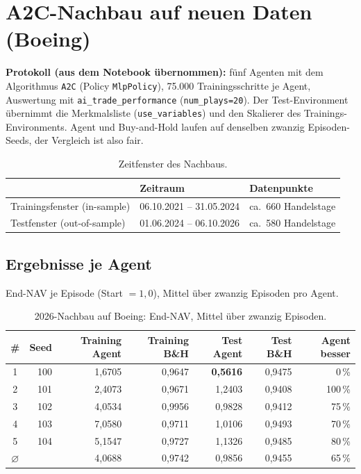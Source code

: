 \section{A2C-Nachbau auf neuen Daten (Boeing)}
\label{sec:a2c}

\textbf{Protokoll (aus dem Notebook übernommen):} fünf Agenten mit dem Algorithmus
\texttt{A2C} (Policy \texttt{MlpPolicy}), 75.000 Trainingsschritte je Agent, Auswertung mit
\texttt{ai\_trade\_performance} (\texttt{num\_plays=20}). Der Test-Environment übernimmt die
Merkmalsliste (\texttt{use\_variables}) und den Skalierer des Trainings-Environments. Agent und
Buy-and-Hold laufen auf denselben zwanzig Episoden-Seeds, der Vergleich ist also fair.

\begin{table}[H]
  \centering
  \caption{Zeitfenster des Nachbaus.}
  \label{tab:fenster}
  \begin{tabular}{lll}
    \toprule
     & Zeitraum & Datenpunkte\\
    \midrule
    Trainingsfenster (in-sample)   & 06.10.2021 -- 31.05.2024 & ca.\ 660 Handelstage\\
    Testfenster (out-of-sample)    & 01.06.2024 -- 06.10.2026 & ca.\ 580 Handelstage\\
    \bottomrule
  \end{tabular}
\end{table}

\subsection{Ergebnisse je Agent}

End-NAV je Episode (Start $=1{,}0$), Mittel über zwanzig Episoden pro Agent.

\begin{table}[H]
  \centering
  \caption{2026-Nachbau auf Boeing: End-NAV, Mittel über zwanzig Episoden.}
  \label{tab:a2c}
  \begin{tabular}{crrr|rrr}
    \toprule
    \# & Seed & Training Agent & Training B\&H & Test Agent & Test B\&H & Agent besser\\
    \midrule
    1 & 100 & 1,6705 & 0,9647 & \textbf{0,5616} & 0,9475 & 0\,\%\\
    2 & 101 & 2,4073 & 0,9671 & 1,2403 & 0,9408 & 100\,\%\\
    3 & 102 & 4,0534 & 0,9956 & 0,9828 & 0,9412 & 75\,\%\\
    4 & 103 & 7,0580 & 0,9711 & 1,0106 & 0,9493 & 70\,\%\\
    5 & 104 & 5,1547 & 0,9727 & 1,1326 & 0,9485 & 80\,\%\\
    \midrule
    $\varnothing$ & & 4,0688 & 0,9742 & 0,9856 & 0,9455 & 65\,\%\\
    \bottomrule
  \end{tabular}
\end{table}

